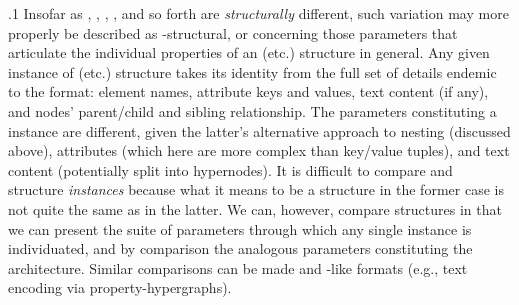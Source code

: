 \documentclass[11pt, twocolumn]{article}
\begin{document}
\p.1{%
Insofar as , , , , and so forth are \textit{structurally}
different, such variation may more properly be
described as -structural, or concerning those
parameters that articulate the individual properties of an
 (etc.) structure in general. Any given instance
of  (etc.) structure takes its identity from the
full set of details endemic to the  format: element
names, attribute keys and values, text content (if any),
and nodes' parent/child and sibling relationship.
The parameters constituting a  instance are
different, given the latter's alternative approach
to nesting (discussed above), attributes (which here are
more complex than key/value tuples), and text
content (potentially split into hypernodes). It is
difficult to compare  and  structure
\textit{instances} because what it means to be a structure
in the former case is not quite the same as in the latter.
We can, however, compare  structures in that
we can present the suite of parameters through which
any single  instance is individuated, and by comparison
the analogous parameters constituting the  architecture.
Similar comparisons can be made \visavis{}  and
-like formats (e.g., text encoding via property-hypergraphs).
}%
\end{document}
